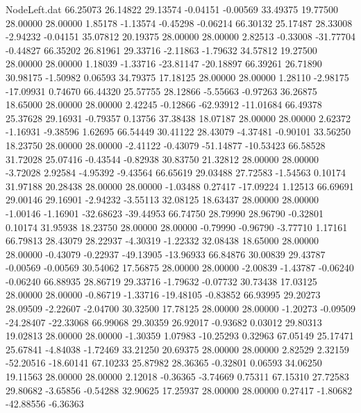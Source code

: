 \begin{filecontents}{NodeLeft.dat}
  66.25073   26.14822   29.13574    -0.04151   -0.00569   33.49375   19.77500   28.00000   28.00000    1.85178   -1.13574   -0.45298   -0.06214
  66.30132   25.17487   28.33008    -2.94232   -0.04151   35.07812   20.19375   28.00000   28.00000    2.82513   -0.33008  -31.77704   -0.44827
  66.35202   26.81961   29.33716    -2.11863   -1.79632   34.57812   19.27500   28.00000   28.00000    1.18039   -1.33716  -23.81147  -20.18897
  66.39261   26.71890   30.98175    -1.50982    0.06593   34.79375   17.18125   28.00000   28.00000    1.28110   -2.98175  -17.09931    0.74670
  66.44320   25.57755   28.12866    -5.55663   -0.97263   36.26875   18.65000   28.00000   28.00000    2.42245   -0.12866  -62.93912  -11.01684
  66.49378   25.37628   29.16931    -0.79357    0.13756   37.38438   18.07187   28.00000   28.00000    2.62372   -1.16931   -9.38596    1.62695
  66.54449   30.41122   28.43079    -4.37481   -0.90101   33.56250   18.23750   28.00000   28.00000   -2.41122   -0.43079  -51.14877  -10.53423
  66.58528   31.72028   25.07416    -0.43544   -0.82938   30.83750   21.32812   28.00000   28.00000   -3.72028    2.92584   -4.95392   -9.43564
  66.65619   29.03488   27.72583    -1.54563    0.10174   31.97188   20.28438   28.00000   28.00000   -1.03488    0.27417  -17.09224    1.12513
  66.69691   29.00146   29.16901    -2.94232   -3.55113   32.08125   18.63437   28.00000   28.00000   -1.00146   -1.16901  -32.68623  -39.44953
  66.74750   28.79990   28.96790    -0.32801    0.10174   31.95938   18.23750   28.00000   28.00000   -0.79990   -0.96790   -3.77710    1.17161
  66.79813   28.43079   28.22937    -4.30319   -1.22332   32.08438   18.65000   28.00000   28.00000   -0.43079   -0.22937  -49.13905  -13.96933
  66.84876   30.00839   29.43787    -0.00569   -0.00569   30.54062   17.56875   28.00000   28.00000   -2.00839   -1.43787   -0.06240   -0.06240
  66.88935   28.86719   29.33716    -1.79632   -0.07732   30.73438   17.03125   28.00000   28.00000   -0.86719   -1.33716  -19.48105   -0.83852
  66.93995   29.20273   28.09509    -2.22607   -2.04700   30.32500   17.78125   28.00000   28.00000   -1.20273   -0.09509  -24.28407  -22.33068
  66.99068   29.30359   26.92017    -0.93682    0.03012   29.80313   19.02813   28.00000   28.00000   -1.30359    1.07983  -10.25293    0.32963
  67.05149   25.17471   25.67841    -4.84038   -1.72469   33.21250   20.69375   28.00000   28.00000    2.82529    2.32159  -52.20516  -18.60141
  67.10233   25.87982   28.36365    -0.32801    0.06593   34.06250   19.11563   28.00000   28.00000    2.12018   -0.36365   -3.74669    0.75311
  67.15310   27.72583   29.80682    -3.65856   -0.54288   32.90625   17.25937   28.00000   28.00000    0.27417   -1.80682  -42.88556   -6.36363

\end{filecontents}
